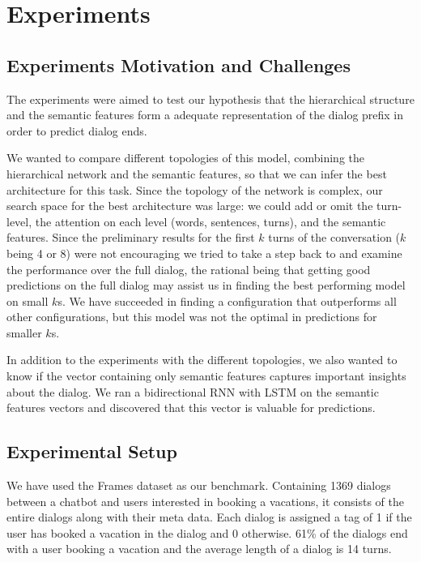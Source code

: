 \section{Experiments}\label{sec:exp}
\subsection{Experiments Motivation and Challenges}
The experiments were aimed to test our hypothesis that the hierarchical 
structure and the semantic features form a adequate representation of 
the dialog prefix in order to predict dialog ends. 

We wanted to compare different topologies of this model, 
combining the hierarchical network and the semantic features, 
so that we can infer the best architecture for this task. 
Since the topology of the network is complex, our search space for the best architecture 
was large: we could add or omit the turn-level, the attention on each level (words, sentences, turns), 
and the semantic features. 
Since the preliminary results for the first $k$ turns of the conversation ($k$ being 4 or 8) 
were not encouraging we tried to take a step back to and examine the performance over the full dialog, 
the rational being that getting good predictions on the full dialog may assist 
us in finding the best performing model on small $k$s. 
We have succeeded in finding a configuration that outperforms all other configurations, 
but this model was not the optimal in predictions for smaller $k$s. 

In addition to the experiments with the different topologies, we also wanted to know if the vector containing only semantic features 
captures important insights about the dialog. 
We ran a bidirectional RNN with LSTM on the semantic features vectors and 
discovered that this vector is valuable for predictions.

\subsection{Experimental Setup}
We have used the Frames dataset \cite{frames} as 
our benchmark. Containing 1369 dialogs between 
a chatbot and users interested in booking a vacations, 
it consists of the entire dialogs along with their meta data. 
Each dialog is assigned a tag of 1 if the user has booked a vacation 
in the dialog and 0 otherwise. 61\% of the dialogs end with a user 
booking a vacation and the average length of a dialog is 14 turns. 

